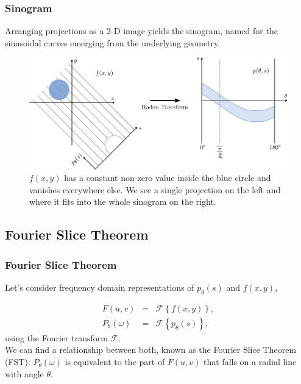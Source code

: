 \begin{frame}
	\frametitle{Sinogram}

	Arranging projections as a 2-D image yields the sinogram, named for the sinusoidal curves emerging from the underlying geometry.

	\begin{figure}[tbp]
		\centering
		\includegraphics[width=0.75\linewidth]{images/radon_2}
		\caption{$f(x, y)$ has a constant non-zero value inside the blue circle and vanishes everywhere else. We see a single projection on the left and where it fits into the whole sinogram on the right.}%
		\label{fig:ct_radon_2}
	\end{figure}

\end{frame}

\subsection{Fourier Slice Theorem}%
\label{sub:ct_fourier}

\begin{frame}
	\frametitle{Fourier Slice Theorem}

	Let's consider frequency domain representations of $p_\theta(s)$ and $f(x, y)$,

	\begin{eqnarray}
		F(u,v) &=& \mathcal{F}\left\{f(x,y)\right\},\\
		P_{\theta}(\omega) &=& \mathcal{F}\left\{p_\theta(s)\right\},
	\end{eqnarray}
	using the Fourier transform $\mathcal{F}$.\\[1cm]

	We can find a relationship between both, known as the Fourier Slice Theorem (FST):
	$P_{\theta}(\omega)$ is equivalent to the part of $F(u,v)$ that falls on a radial line with angle $\theta$.
\end{frame}

